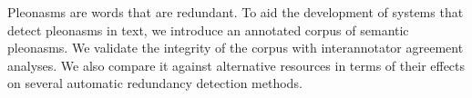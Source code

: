Pleonasms are words that are redundant. To aid the development of systems that detect pleonasms in text, we introduce an annotated corpus of semantic pleonasms. We validate the integrity of the corpus with interannotator agreement analyses. We also compare it against alternative resources in terms of their effects on several automatic redundancy detection methods.
